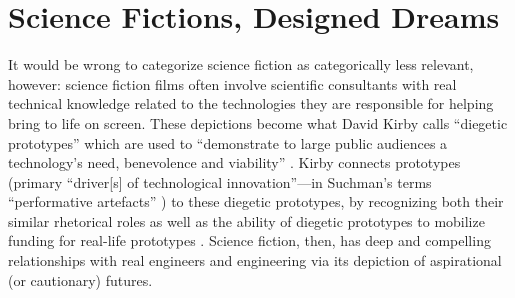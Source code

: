 \section{Science Fictions, Designed Dreams}

It would be wrong to categorize science
fiction as categorically less relevant, however: science fiction
films
often involve scientific consultants with real
technical knowledge related to the technologies they are responsible for
helping bring to life on screen. These depictions become what David
Kirby calls ``diegetic prototypes'' which are used to ``demonstrate to
large public audiences a technology's need, benevolence and
viability'' \cite[p. 43]{kirbyFuture}. Kirby connects prototypes (primary
``driver[s] of technological innovation''---in
Suchman's terms ``performative artefacts'' \cite[p. 45]{kirbyFuture})
to these diegetic prototypes, 
by recognizing both their similar rhetorical roles as well as the
ability of diegetic prototypes to mobilize funding for real-life
prototypes \cite[p. 44-47]{kirbyFuture}. Science fiction, then, has deep
and compelling relationships with real engineers and engineering via
its depiction of aspirational (or cautionary) futures.




